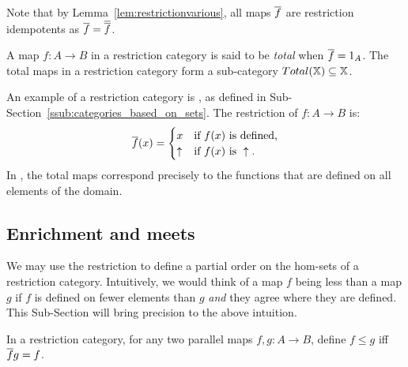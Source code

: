 Note that by Lemma~\ref{lem:restrictionvarious}, all maps $\overline{f}$ are restriction idempotents
as $\overline{f}=\overline{\overline{f}}$.


\begin{definition}\label{def:total_map}
  A map $f:A\to B$ in a restriction category is said to be \emph{total} when
  $\overline{f} = 1_A$. The total maps in a restriction category form a sub-category
  $Total(\mathbb{X}) \subseteq \mathbb{X}$.
\end{definition}


An example of a restriction category is \Par, as defined in
Sub-Section~\ref{ssub:categories_based_on_sets}. The restriction of $f:A\to B$ is:
\[
  \overline{f}(x) =
  \begin{cases}
    x&\text{if $f(x)$ is defined,}\\
    \uparrow&\text{if }f(x)\text{ is }\uparrow.
  \end{cases}
\]
In \Par, the
total maps correspond precisely to the functions that are defined on all elements of the domain.


\subsection{Enrichment and meets} %
\label{sub:enrichment_and_meets}

We may use the restriction to define a partial order on the hom-sets of a restriction
category. Intuitively, we would think of a map $f$ being less than a map $g$ if $f$ is
defined on fewer elements than $g$ \emph{and} they agree where they are defined. This Sub-Section
will bring precision to the above intuition.

\begin{definition}\label{def:restriction_category_hom_set_ordering}
  In a restriction category, for any two parallel maps  $f,g:A\to B$, define $f \le g$ iff
  $\overline{f} g = f$.

\end{definition}


